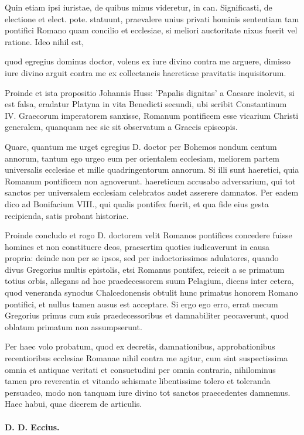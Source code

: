 Quin etiam ipsi iuristae, de quibus minus videretur, in can. Significasti, de electione et elect. pote. statuunt, praevalere unius privati hominis sententiam tam pontifici Romano quam concilio et ecclesiae, si meliori auctoritate nixus fuerit vel ratione. Ideo nihil est,

quod egregius dominus doctor, volens ex iure divino contra me arguere, dimisso iure divino arguit contra me ex collectaneis haereticae pravitatis inquisitorum.

Proinde et ista propositio Johannis Huss: 'Papalis dignitas' a Caesare inolevit, si est falsa, eradatur Platyna in vita Benedicti \marginpar{\small[280]} secundi, ubi scribit Constantinum IV. Graecorum imperatorem sanxisse, Romanum pontificem esse vicarium Christi generalem, quanquam nec sic sit observatum a Graecis episcopis.

Quare, quantum me urget egregius D. doctor per Bohemos nondum centum annorum, tantum ego urgeo eum per orientalem ecclesiam, meliorem partem universalis ecclesiae et mille quadringentorum annorum. Si illi sunt haeretici, quia Romanum pontificem non agnoverunt. haereticum accusabo adversarium, qui tot sanctos per universalem ecclesiam celebratos audet asserere damnatos. Per eadem dico ad Bonifacium VIII., qui qualis pontifex fuerit, et qua fide eius gesta recipienda, satis probant historiae.

Proinde concludo et rogo D. doctorem velit Romanos pontifices concedere fuisse homines et non constituere deos, praesertim quoties iudicaverunt in causa propria: deinde non per se ipsos, sed per indoctorissimos adulatores, quando divus Gregorius multis epistolis, etsi Romanus pontifex, reiecit a se primatum totius orbis, allegans ad hoc praedecessorem suum Pelagium, dicens inter cetera, quod veneranda synodus Chalcedonensis obtulit hunc primatus honorem Romano pontifici, et nullus tamen ausus est acceptare. Si ergo ego erro, errat mecum Gregorius primus cum suis praedecessoribus et damnabiliter peccaverunt, quod oblatum primatum non assumpserunt.

Per haec volo probatum, quod ex decretis, damnationibus, approbationibus recentioribus ecclesiae Romanae nihil contra me agitur, cum sint suspectissima omnia et antiquae veritati et consuetudini per omnia contraria, nihilominus tamen pro reverentia et vitando schismate libentissime tolero et toleranda persuadeo, modo non tanquam iure divino tot sanctos praecedentes damnemus. Haec habui, quae dicerem de articulis.

\paragraph*{D. D. Eccius.}

